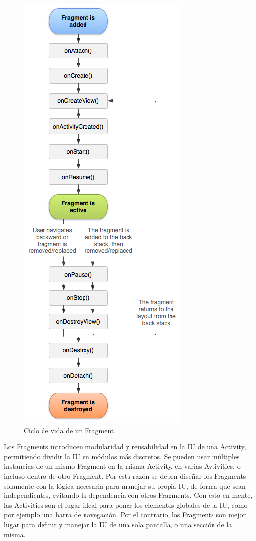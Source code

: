 \begin{figure}[H]
  \centering
    \includegraphics[scale=0.4]{04-framework/fragment_lifecycle.png} 
   \caption{Ciclo de vida de un Fragment}
   \label{fig:umlFrameworkCore}
\end{figure}


Los Fragments introducen modularidad y reusabilidad en la IU de una Activity, permitiendo dividir la IU en módulos más discretos. Se pueden usar múltiples instancias de un mismo Fragment en la misma Activity, en varias Avtivities, o incluso dentro de otro Fragment. Por esta razón se deben diseñar los Fragments solamente con la lógica necesaria para manejar su propia IU, de forma que sean independientes, evitando la dependencia con otros Fragments.
Con esto en mente, las Activities son el lugar ideal para poner los elementos globales de la IU, como por ejemplo una barra de navegación. Por el contrario, los Fragments son mejor lugar para definir y manejar la IU de una sola pantalla, o una sección de la misma.

